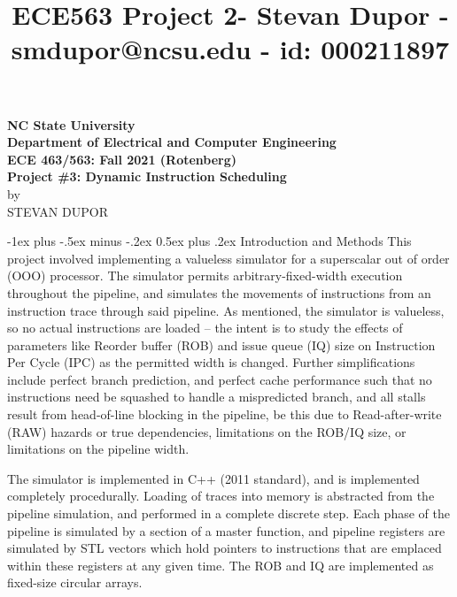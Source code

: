 \documentclass[12pt,portrait]{article}
\title{ECE563 Project 2- Stevan Dupor - smdupor@ncsu.edu - id: 000211897}
\makeatletter
\renewcommand{\section}{\@startsection{section}{1}{0mm}%
                                {-1ex plus -.5ex minus -.2ex}%
                                {0.5ex plus .2ex}%
                                {\normalfont\large\bfseries}}
\makeatother
\begin{document}
\footnotesize
\vspace{5cm}
\begin{center}
{\large
\textbf{NC State University\\
\vspace{1cm}
Department of Electrical and Computer Engineering\\
\vspace{1cm}
ECE 463/563: Fall 2021 (Rotenberg)\\
\vspace{1cm}
Project \#3: Dynamic Instruction Scheduling}\\}
\vspace{3cm}
by\\
\vspace{1cm}
{\huge STEVAN DUPOR}\\ 

\vspace{4cm}
\noindent{}
\pagebreak
\end{center}

\section{Introduction and Methods}
This project involved implementing a valueless simulator for a superscalar out of order (OOO) processor. The simulator permits arbitrary-fixed-width execution throughout the pipeline, and simulates the movements of instructions from an instruction trace through said pipeline. As mentioned, the simulator is valueless, so no actual instructions are loaded -- the intent is to study the effects of parameters like Reorder buffer (ROB) and issue queue (IQ) size on Instruction Per Cycle (IPC) as the permitted width is changed. Further simplifications include perfect branch prediction, and perfect cache performance such that no instructions need be squashed to handle a mispredicted branch, and all stalls result from head-of-line blocking in the pipeline, be this due to Read-after-write (RAW) hazards or true dependencies, limitations on the ROB/IQ size, or limitations on the pipeline width. 
 
The simulator is implemented in C++ (2011 standard), and is implemented completely procedurally. Loading of traces into memory is abstracted from the pipeline simulation, and performed in a complete discrete step. Each phase of the pipeline is simulated by a section of a master function, and pipeline registers are simulated by STL vectors which hold pointers to instructions that are emplaced within these registers at any given time. The ROB and IQ are implemented as fixed-size circular arrays. 
\end{document}
